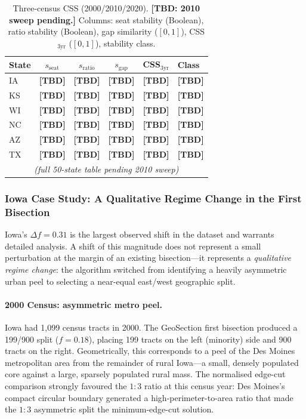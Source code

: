 \begin{table}[h]
\centering
\caption{Three-census CSS (2000/2010/2020). \textbf{[TBD: 2010 sweep pending.]}
  Columns: seat stability (Boolean), ratio stability (Boolean), gap similarity ($[0,1]$),
  CSS$_{3\text{yr}}$ ($[0,1]$), stability class.}
\label{tab:three-census-css}
\small
\begin{tabular}{l c c c c l}
\toprule
State & $s_{\text{seat}}$ & $s_{\text{ratio}}$ & $s_{\text{gap}}$ & CSS$_{3\text{yr}}$ & Class \\
\midrule
IA  & \textbf{[TBD]} & \textbf{[TBD]} & \textbf{[TBD]} & \textbf{[TBD]} & \textbf{[TBD]} \\
KS  & \textbf{[TBD]} & \textbf{[TBD]} & \textbf{[TBD]} & \textbf{[TBD]} & \textbf{[TBD]} \\
WI  & \textbf{[TBD]} & \textbf{[TBD]} & \textbf{[TBD]} & \textbf{[TBD]} & \textbf{[TBD]} \\
NC  & \textbf{[TBD]} & \textbf{[TBD]} & \textbf{[TBD]} & \textbf{[TBD]} & \textbf{[TBD]} \\
AZ  & \textbf{[TBD]} & \textbf{[TBD]} & \textbf{[TBD]} & \textbf{[TBD]} & \textbf{[TBD]} \\
TX  & \textbf{[TBD]} & \textbf{[TBD]} & \textbf{[TBD]} & \textbf{[TBD]} & \textbf{[TBD]} \\
\multicolumn{6}{c}{\textit{(full 50-state table pending 2010 sweep)}} \\
\bottomrule
\end{tabular}
\end{table}

\subsubsection{Iowa Case Study: A Qualitative Regime Change in the First Bisection}
\label{sec:iowa-case-study}

Iowa's $\Delta f = 0.31$ is the largest observed shift in the dataset and warrants
detailed analysis.
A shift of this magnitude does not represent a small perturbation at the margin
of an existing bisection---it represents a \emph{qualitative regime change}: the
algorithm switched from identifying a heavily asymmetric urban peel to selecting
a near-equal east/west geographic split.

\paragraph{2000 Census: asymmetric metro peel.}
Iowa had 1{,}099 census tracts in 2000.
The GeoSection first bisection produced a 199/900 split ($f = 0.18$), placing
199 tracts on the left (minority) side and 900 tracts on the right.
Geometrically, this corresponds to a peel of the Des Moines metropolitan area
from the remainder of rural Iowa---a small, densely populated core against a
large, sparsely populated rural mass.
The normalised edge-cut comparison strongly favoured the $1:3$ ratio at this
census year: Des Moines's compact circular boundary generated a
high-perimeter-to-area ratio that made the $1:3$ asymmetric split the
minimum-edge-cut solution.

